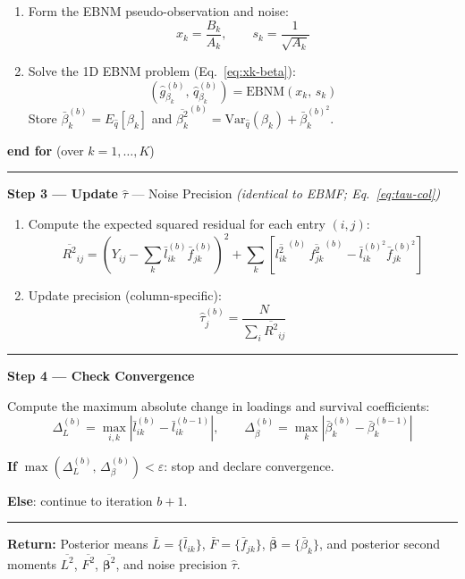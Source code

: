 \documentclass{article}[12pt]
\newcommand{\lbar}[2]{\bar{l}_{#1#2}}
\newcommand{\fbar}[2]{\bar{f}_{#1#2}}
\newcommand{\bbar}[1]{\bar{\beta}_{#1}}
\newcommand{\lsec}[2]{\overline{l^{2}_{#1#2}}}
\newcommand{\fsec}[2]{\overline{f^{2}_{#1#2}}}
\newcommand{\bsec}[1]{\overline{\beta^{2}_{#1}}}
\begin{document}
\begin{tcolorbox}[
  breakable,
  colback=gray!4!white, colframe=black!70,
  title={\textbf{Algorithm 1.} Supervised MF --- CAVI Update Procedure},
  fonttitle=\bfseries, left=6pt, right=6pt, top=6pt, bottom=6pt
]
\begin{enumerate}[label=\textbf{c.\arabic*.}, leftmargin=2cm]
    \item Form the EBNM pseudo-observation and noise:
    \[
        x_k = \frac{B_k}{A_k}, \qquad s_k = \frac{1}{\sqrt{A_k}}
    \]

    \item Solve the 1D EBNM problem (Eq.~\ref{eq:xk-beta}):
    \[
        \left(\hat{g}_{\beta_k}^{(b)},\,\hat{q}_{\beta_k}^{(b)}\right)
        = \mathrm{EBNM}(x_k,\, s_k)
    \]
    Store $\bbar{k}^{(b)} = E_{\hat{q}}[\beta_k]$ and
    $\bsec{k}^{(b)} = \mathrm{Var}_{\hat{q}}(\beta_k) + \bbar{k}^{(b)^2}$.
\end{enumerate}

\medskip
\noindent\textbf{end for} (over $k=1,\ldots,K$)

\medskip
\hrule
\medskip

\textbf{Step 3 --- Update} $\hat{\tau}$ --- Noise Precision
\quad\emph{(identical to EBMF; Eq.~\ref{eq:tau-col})}

\begin{enumerate}[label=\textbf{3.\arabic*.}, leftmargin=2cm]
    \item Compute the expected squared residual for each entry $(i,j)$:
    \[
        \overline{R^2}_{ij}
        = \left(Y_{ij} - \sum_k \lbar{i}{k}^{(b)}\fbar{j}{k}^{(b)}\right)^{\!2}
          + \sum_k\!\left[\lsec{i}{k}^{(b)}\,\fsec{j}{k}^{(b)}
            - \lbar{i}{k}^{(b)^2}\fbar{j}{k}^{(b)^2}\right]
    \]

    \item Update precision (column-specific):
    \[
        \hat{\tau}_j^{(b)} = \frac{N}{\displaystyle\sum_i \overline{R^2}_{ij}}
    \]
\end{enumerate}

\medskip
\hrule
\medskip

\textbf{Step 4 --- Check Convergence}

Compute the maximum absolute change in loadings and survival coefficients:
\[
    \Delta_L^{(b)} = \max_{i,k}\left|\lbar{i}{k}^{(b)} - \lbar{i}{k}^{(b-1)}\right|,
    \qquad
    \Delta_\beta^{(b)} = \max_k\left|\bbar{k}^{(b)} - \bbar{k}^{(b-1)}\right|
\]

\textbf{If} $\max\!\left(\Delta_L^{(b)},\,\Delta_\beta^{(b)}\right) < \varepsilon$:
stop and declare convergence.

\textbf{Else}: continue to iteration $b+1$.

\medskip
\hrule
\medskip

\textbf{Return:}
Posterior means $\bar{L} = \{\lbar{i}{k}\}$,
$\bar{F} = \{\fbar{j}{k}\}$,
$\bar{\bm{\beta}} = \{\bbar{k}\}$,
and posterior second moments
$\overline{L^2}$, $\overline{F^2}$, $\overline{\bm{\beta}^2}$,
and noise precision $\hat{\tau}$.
\end{tcolorbox}
\end{document}
